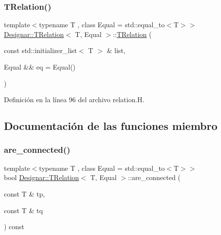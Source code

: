 \mbox{\label{class_designar_1_1_t_relation_ac745ed02be7d1aac2a70473fc1d4b4b7}} 
\subsubsection{\texorpdfstring{T\+Relation()}{TRelation()}\hspace{0.1cm}{\footnotesize\ttfamily [4/4]}}
{\footnotesize\ttfamily template$<$typename T , class Equal  = std\+::equal\+\_\+to$<$\+T$>$$>$ \\
\hyperlink{class_designar_1_1_t_relation}{Designar\+::\+T\+Relation}$<$ T, Equal $>$\+::\hyperlink{class_designar_1_1_t_relation}{T\+Relation} (\begin{DoxyParamCaption}\item[{const std\+::initializer\+\_\+list$<$ T $>$ \&}]{list,  }\item[{Equal \&\&}]{eq = {\ttfamily Equal()} }\end{DoxyParamCaption})\hspace{0.3cm}{\ttfamily [inline]}}



Definición en la línea 96 del archivo relation.\+H.



\subsection{Documentación de las funciones miembro}
\mbox{\label{class_designar_1_1_t_relation_a1746e01b4c0e1d96aca73ad8d6b66ad1}} 
\subsubsection{\texorpdfstring{are\+\_\+connected()}{are\_connected()}}
{\footnotesize\ttfamily template$<$typename T , class Equal  = std\+::equal\+\_\+to$<$\+T$>$$>$ \\
bool \hyperlink{class_designar_1_1_t_relation}{Designar\+::\+T\+Relation}$<$ T, Equal $>$\+::are\+\_\+connected (\begin{DoxyParamCaption}\item[{const T \&}]{tp,  }\item[{const T \&}]{tq }\end{DoxyParamCaption}) const\hspace{0.3cm}{\ttfamily [inline]}}



